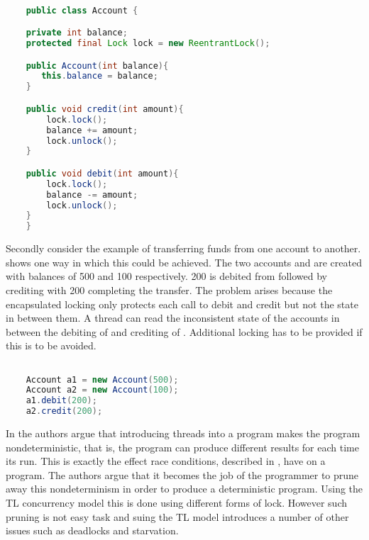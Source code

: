 \begin{lstlisting}[float,label=lst:account_example,
  caption={Encapsulated locking},
  language=Java,  
  showspaces=false,
  showtabs=false,
  breaklines=true,
  showstringspaces=false,
  breakatwhitespace=true,
  commentstyle=\color{greencomments},
  keywordstyle=\color{bluekeywords},
  stringstyle=\color{redstrings}]  % Start your code-block

	public class Account {

    private int balance;
    protected final Lock lock = new ReentrantLock();

    public Account(int balance){
       this.balance = balance;
    }

    public void credit(int amount){
        lock.lock();
        balance += amount;
        lock.unlock();
    }

    public void debit(int amount){
        lock.lock();
        balance -= amount;
        lock.unlock();
    }
	}
\end{lstlisting}

Secondly consider the example of transferring funds from one account to another.  shows one way in which this could be achieved. The two accounts  and  are created with balances of 500 and 100 respectively. 200 is debited from  followed by crediting  with 200 completing the transfer. The problem arises because the encapsulated locking only protects each call to debit and credit but not the state in between them\cite[p. 59]{sutter2005software}. A thread can read the inconsistent state of the accounts in between the debiting of  and crediting of . Additional locking has to be provided  if this is to be avoided.

\begin{lstlisting}[float,label=lst:account_example_transfer,
  caption={Funds transfer between two accounts},
  language=Java,  
  showspaces=false,
  showtabs=false,
  breaklines=true,
  showstringspaces=false,
  breakatwhitespace=true,
  commentstyle=\color{greencomments},
  keywordstyle=\color{bluekeywords},
  stringstyle=\color{redstrings}]  % Start your code-block

    Account a1 = new Account(500);
    Account a2 = new Account(100);
    a1.debit(200);
    a2.credit(200);
\end{lstlisting}

In \cite{lee2006problem} the authors argue that introducing threads into a program makes the program nondeterministic, that is, the program can produce different results for each time its run. This is exactly the effect race conditions, described in \cite{subsec:race_coditions}, have on a program. The authors argue that it becomes the job of the programmer to prune away this nondeterminism in order to produce a deterministic program. Using the \ac{TL} concurrency model this is done using different forms of lock. However such pruning is not easy task and suing the \ac{TL} model introduces a number of other issues such as deadlocks and starvation.

